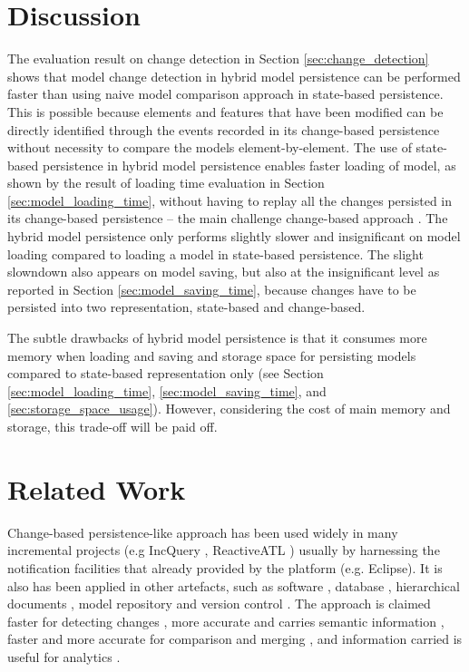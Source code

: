 \documentclass[10pt,conference]{IEEEtran}
\begin{document}
\section{Discussion}
\label{sec:discussion}
The evaluation result on change detection in Section \ref{sec:change_detection} shows that model change detection in hybrid model persistence can be performed faster than using naive model comparison approach in state-based persistence. This is possible because elements and features that have been modified can be directly identified through the events recorded in its change-based persistence without necessity to compare the models element-by-element. The use of state-based persistence in hybrid model persistence enables faster loading of model, as shown by the result of loading time evaluation in Section \ref{sec:model_loading_time}, without having to replay all the changes persisted in its change-based persistence -- the main challenge change-based approach \cite{mens2002state}. 
The hybrid model persistence only performs slightly slower and insignificant on model loading compared to loading a model in state-based persistence. The slight slowndown also appears on model saving, but also at the insignificant level as reported in Section \ref{sec:model_saving_time}, because changes have to be persisted into two representation, state-based and change-based. 

The subtle drawbacks of hybrid model persistence is that it consumes more memory when loading and saving and storage space for persisting models compared to state-based representation only (see Section \ref{sec:model_loading_time}, \ref{sec:model_saving_time}, and \ref{sec:storage_space_usage}). However, considering the cost of main memory and storage, this trade-off will be paid off.

\section{Related Work}
\label{sec:related_work}
 Change-based persistence-like approach has been used widely in many incremental projects (e.g IncQuery \cite{DBLP:conf/ecmdafa/RathHV12}, ReactiveATL \cite{DBLP:conf/ecmdafa/OgunyomiRK15}) usually by harnessing the notification facilities that already provided by the platform (e.g. Eclipse). It is also has been applied in other artefacts, such as software \cite{DBLP:journals/entcs/RobbesL07}, database \cite{DBLP:conf/sde/LippeO92}, hierarchical documents \cite{DBLP:conf/caise/IgnatN05}, model repository and version control \cite{koegel2010emfstore}. The approach is claimed faster for detecting changes \cite{DBLP:conf/edoc/KoegelHLHD10}, more accurate and carries semantic information \cite{DBLP:journals/entcs/RobbesL07,DBLP:conf/sde/LippeO92,DBLP:conf/caise/IgnatN05,mens2002state}, faster and more accurate for comparison and merging \cite{DBLP:conf/sde/LippeO92,DBLP:conf/caise/IgnatN05,koegel2010emfstore}, and information carried is useful for analytics \cite{DBLP:journals/entcs/RobbesL07}.
\end{document}

